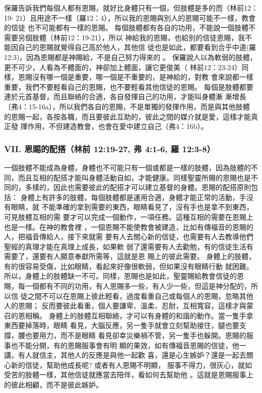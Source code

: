 保羅告訴我們每個人都有恩賜，就好比身體只有一個，但肢體是多的而（林前12：19-
21）且用途不一樣（羅12：4），所以我的恩賜與別人的恩賜可能不一樣，教會的信徒
也不可能都有一樣的恩賜。
每個肢體都有各自的功用，不能說一個肢體不需要另個肢體（林前12：19-21），所以
神給我的恩賜，也給別的信徒恩賜，我不能因自己的恩賜就覺得自己高於他人，其他信
徒也是如此，都要看到合乎中道(羅 12:3)，因為恩賜都是神賜給，不是自己努力得來的
。
保羅說人以為軟弱的肢體，更不可少，人看為不體面的，神卻加上體面，讓它更俊美（
林前12：23-24）同樣，恩賜沒有哪一個是重要，哪一個是不重要的，是神給的，對教
會來說都一樣重要，我們不要輕看自己的恩賜，也不要輕看其他信徒的恩賜。
每個是肢體都要連於元首基督，而且聯絡的合適，各自發揮自己的功用，才能叫身體漸
漸增長（弗4：15-16a），所以我們各自的恩賜，不是單獨的發揮作用，而是與其他肢體
的恩賜一起，各按各職，而且要彼此互助的，彼此之間的媒介就是愛，這樣才能真正發
揮作用，不但建造教會，也會在愛中建立自己（弗4：16b）。


\subsubsection{VII. 恩賜的配搭（林前 12:19-27, 弗 4:1-6, 羅 12:3-8）}

一個肢體不能成為身體，身體也不可能只有一個或都是一樣的肢體，因為肢體的不同，而且互相的配搭才能叫身體活動自如，才能健康。同樣聖靈所賜的恩賜也是不同的，多樣的，因此也需要彼此的配搭才可以建立基督的身體。恩賜的配搭原則包括：
身體上有許多的肢體，每個肢體都是運用合適，身體才能正常的活動，手沒有眼睛，就
不能準確的拿到需要的東西，眼睛看見了，沒有手也是拿不到東西，可見肢體互相的需
要才可以完成一個動作，一項任務。這種互相的需要在恩賜上也是一樣。在神的教會裡
，一個恩賜不能使教會被建造，比如有傳福音的恩賜的人，把福音傳給人，接下來就需
要有人去關心新的信徒，也需要有人去教導他們聖經的真理才能在真理上成長，如果軟
弱了還需要有人去勸勉，有的信徒生活有需要了，還要有人願意奉獻所需等，這就是恩
賜上的彼此需要。
身體上的肢體，有的很容易受傷，比如眼睛，看起來好像很軟弱，但如果沒有眼睛行動
就困難。所以，身體上的肢體缺一不可。同樣，恩賜也是如此，聖靈賜給教會信徒的恩
賜，每一個都有不同的功用，有人恩賜多一些，有人少一些，但這是神分配的，所以信
徒之間不可以在恩賜上彼此輕看，過度看重自己或每個人的恩賜，忽略其他人的恩賜；
反而要彼此看重，個人要謙卑、溫柔、忍耐，互相寬容，這樣才與蒙召的恩相稱。
身體上的肢體互相聯絡，才可以有身體的和諧的動作。當一隻手拿東西要掉落時，眼睛
看見，大腦反應，另一隻手就會立刻幫助接住，腿也要支撐，腰也要用力，而不是眼睛
看見卻幸災樂禍不管，另一隻手也躲開。恩賜的服事也不能分開，有的恩賜服事會有明
顯的果效，如有傳福音恩賜的信徒，他一講，有人就信主，其他人的反應是與他一起歡
喜，還是心生嫉妒？還是一起去關心新的信徒，幫助他成長呢? 或者有人恩賜不明顯，
服事不得力，很灰心，就如受苦的肢體一樣，其他信徒就應當去陪伴，看如何去幫助他
。這就是恩賜服事上的彼此相顧，而不是彼此嫉妒。

